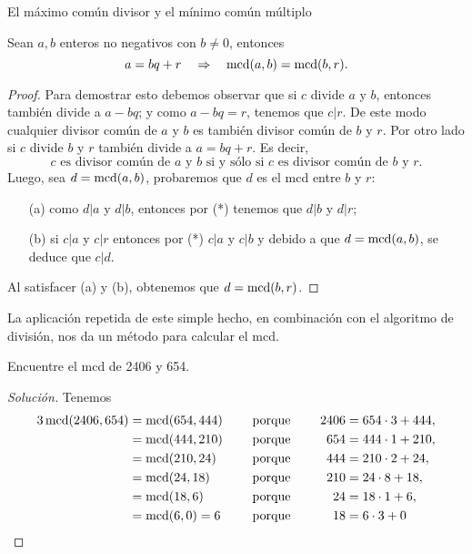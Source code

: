 \begin{section}{El máximo común divisor y el mínimo común
múltiplo}
\begin{proposicion}\label{prop-alg-eucl} Sean  $a,b$ enteros no negativos con $b \not=0$, entonces 
	\begin{equation}\label{bec}
	a=bq+r\quad \Rightarrow \quad\operatorname{mcd}(a,b)=\operatorname{mcd}(b,r).
	\end{equation}
\end{proposicion}
\begin{proof}
	Para demostrar esto debemos observar que si $c$ divide $a$ y $b$, entonces también divide a $a-bq$; y como $a-bq=r$, tenemos que $c|r$. De este modo cualquier divisor común de $a$ y $b$ es también divisor común de $b$ y $r$.  Por otro lado si $c$ divide $b$ y $r$ también divide a $a=bq+r$. Es decir, 
	\begin{equation}\label{eqmcd1}
	\text{$c$ es divisor común de $a$ y $b$ si y sólo si $c$ es divisor común de $b$ y $r$.} \tag{*}
	\end{equation}
	Luego, sea $d = \operatorname{mcd}(a,b)$, probaremos que $d$ es el mcd entre $b$ y $r$:
	\begin{enumerate}
		\item[({a})] como $d|a$ y $d|b$, entonces por (*) tenemos que $ d|b$ y $d|r$;
		\item[({b})] si $c|a $ y $c|r$ entonces por (*)  $c|a$ y $c|b$ y debido a que $d = \operatorname{mcd}(a,b)$, se deduce que $c|d$.
	\end{enumerate}
	Al satisfacer ({a}) y ({b}), obtenemos que $d = \operatorname{mcd}(b,r)$.
\end{proof}

La aplicación repetida de este simple hecho, en combinación con el algoritmo de división, nos da un método para calcular el mcd.

\begin{ejemplo} Encuentre el mcd de 2406 y 654.
\end{ejemplo}
\begin{proof}[Solución] Tenemos
	\begin{alignat*}3
	\mcd(2406,654)&=\mcd(654,444)&\quad &\text{ porque }\quad& 2406&=654\cdot3+444,\\
	&=\mcd(444,210)& &\text{ porque }\quad& 654&=444\cdot1+210,\\
	&=\mcd(210,24)&& \text{ porque }\quad &444&=210\cdot2+24,\\
	&=\mcd(24,18) && \text{ porque }\quad &210&=24\cdot8+18,\\
	&=\mcd(18,6)  && \text{ porque }\quad &24 &=18\cdot1+6,\\
	& =\mcd(6,0) = 6           &&\text{ porque }\quad&18&=6\cdot3 + 0
	\end{alignat*}
	

\end{proof}
\end{section}
